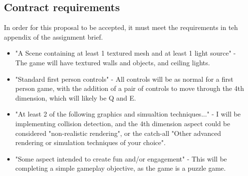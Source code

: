 \documentclass[12pt]{article}
\begin{document}
\subsection{Contract requirements}
In order for this proposal to be accepted, it must meet the requirements in teh appendix of the assignment brief.
\begin{itemize}
    \item "A Scene containing at least 1 textured mesh and at least 1 light source" - The game will have textured walls and objects, and ceiling lights.
    \item "Standard first person controls" - All controls will be as normal for a first person game, with the addition of a pair of controls to move through the 4th dimension, which will likely be Q and E.
    \item "At least 2 of the following graphics and simualtion techniques..." - I will be implementing collision detection, and the 4th dimension aspect could be considered "non-realistic rendering", or the catch-all "Other advanced rendering or simulation techniques of your choice".
    \item "Some aspect intended to create fun and/or engagement" - This will be completing a simple gameplay objective, as the game is a puzzle game.
\end{itemize}
\end{document}
